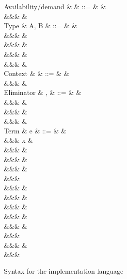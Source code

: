 \begin{figure}
\begin{syntaxfig}
\mbox{Availability/demand}
&
\alpha
&
::=
&
\top
&
\\
&&&
\bot
&
\\[2mm]
\mbox{Type}
&
A, B
&
::=
&
\tyBool
&
\\
&&&
\tyInt
&
\\
&&&
\tyList
&
\\
&&&
&
\\
&&&
&
\\[2mm]
\mbox{Context}
&
\Gamma
&
::=
&
\cxtEmpty
&
\\
&&&
&
\\[2mm]
\mbox{Eliminator}
&
\sigma, \tau
&
::=
&
&
\\
&&&
&
\\
&&&
&
\\
&&&
&
\\[2mm]
\mbox{Term}
&
e
&
::=
&
\bot
&
\\
&&&
x
&
\\
&&&
\exTrue \mid \exFalse
&
\\
&&&
&
\\
&&&
&
\\
&&&
\\
&&&
&
\\
&&&
&
\\
&&&
&
\\
&&&
\exNil
&
\\
&&&
&
\\
&&&
\\
&&&
&
\\
&&&
\end{syntaxfig}
\caption{Syntax for the implementation language}
\label{fig:impl-language:syntax}
\end{figure}
